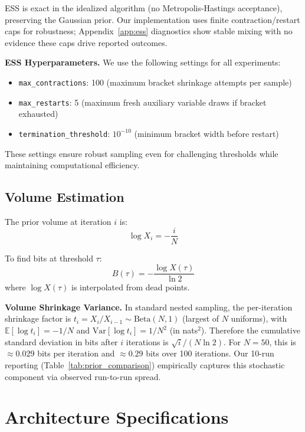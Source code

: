 ESS is exact in the idealized algorithm (no Metropolis-Hastings acceptance), preserving the Gaussian prior. Our implementation uses finite contraction/restart caps for robustness; Appendix~\ref{app:ess} diagnostics show stable mixing with no evidence these caps drive reported outcomes.

\textbf{ESS Hyperparameters.} We use the following settings for all experiments:
\begin{itemize}
    \item \texttt{max\_contractions}: 100 (maximum bracket shrinkage attempts per sample)
    \item \texttt{max\_restarts}: 5 (maximum fresh auxiliary variable draws if bracket exhausted)
    \item \texttt{termination\_threshold}: $10^{-10}$ (minimum bracket width before restart)
\end{itemize}
These settings ensure robust sampling even for challenging thresholds while maintaining computational efficiency.

\subsection{Volume Estimation}

The prior volume at iteration $i$ is:
\begin{equation}
\log X_i = -\frac{i}{N}
\end{equation}

To find bits at threshold $\tau$:
\begin{equation}
B(\tau) = -\frac{\log X(\tau)}{\ln 2}
\end{equation}
where $\log X(\tau)$ is interpolated from dead points.

\textbf{Volume Shrinkage Variance.} In standard nested sampling, the per-iteration shrinkage factor is $t_i=X_i/X_{i-1}\sim\mathrm{Beta}(N,1)$ (largest of $N$ uniforms), with $\mathbb{E}[\log t_i]=-1/N$ and $\mathrm{Var}[\log t_i]=1/N^2$ (in nats$^2$). Therefore the cumulative standard deviation in bits after $i$ iterations is $\sqrt{i}/(N\ln 2)$. For $N=50$, this is $\approx 0.029$ bits per iteration and $\approx 0.29$ bits over 100 iterations. Our 10-run reporting (Table~\ref{tab:prior_comparison}) empirically captures this stochastic component via observed run-to-run spread.




\section{Architecture Specifications}
\label{app:architectures}


